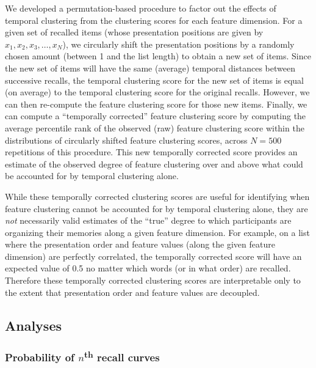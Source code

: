 \documentclass[11pt]{article}
\begin{document}
We developed a permutation-based procedure to factor out the effects of
temporal clustering from the clustering scores for each feature dimension. For
a given set of recalled items (whose presentation positions are given by $x_1,
x_2, x_3, …, x_N$), we circularly shift the presentation positions by a
randomly chosen amount (between 1 and the list length) to obtain a new set of
items. Since the new set of items will have the same (average) temporal
distances between successive recalls, the temporal clustering score for the new
set of items is equal (on average) to the temporal clustering score for the
original recalls. However, we can then re-compute the feature clustering score
for those new items. Finally, we can compute a ``temporally corrected'' feature
clustering score by computing the average percentile rank of the observed (raw)
feature clustering score within the distributions of circularly shifted feature
clustering scores, across $N = 500$ repetitions of this procedure. This new
temporally corrected score provides an estimate of the observed degree of
feature clustering over and above what could be accounted for by temporal
clustering alone.

While these temporally corrected clustering scores are useful for identifying
when feature clustering cannot be accounted for by temporal clustering alone,
they are \textit{not} necessarily valid estimates of the ``true'' degree to
which participants are organizing their memories along a given feature
dimension. For example, on a list where the presentation order and feature
values (along the given feature dimension) are perfectly correlated, the
temporally corrected score will have an expected value of 0.5 no matter which
words (or in what order) are recalled. Therefore these temporally corrected
clustering scores are interpretable only to the extent that presentation order
and feature values are decoupled.

\subsection*{Analyses}

\subsubsection*{Probability of $n$\textsuperscript{th} recall curves}
\end{document}
